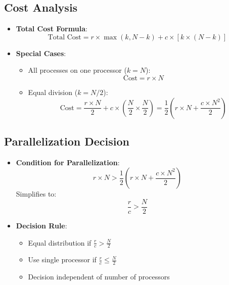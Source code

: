 \documentclass[12pt]{article}
\begin{document}
\subsection{Cost Analysis}
\begin{itemize}
  \item \textbf{Total Cost Formula}:
        \[
          \text{Total Cost} = r \times \max(k, N-k) + c \times [k \times (N-k)]
        \]

  \item \textbf{Special Cases}:
        \begin{itemize}
          \item All processes on one processor ($k = N$):
                \[
                  \text{Cost} = r \times N
                \]

          \item Equal division ($k = N/2$):
                \[
                  \text{Cost} = \frac{r \times N}{2} + c \times \left(\frac{N}{2} \times \frac{N}{2}\right) = \frac{1}{2}\left(r \times N + \frac{c \times N^2}{2}\right)
                \]
        \end{itemize}
\end{itemize}

\subsection{Parallelization Decision}
\begin{itemize}
  \item \textbf{Condition for Parallelization}:
        \[
          r \times N > \frac{1}{2}\left(r \times N + \frac{c \times N^2}{2}\right)
        \]
        Simplifies to:
        \[
          \frac{r}{c} > \frac{N}{2}
        \]

  \item \textbf{Decision Rule}:
        \begin{itemize}
          \item Equal distribution if $\frac{r}{c} > \frac{N}{2}$
          \item Use single processor if $\frac{r}{c} \leq \frac{N}{2}$
          \item Decision independent of number of processors
        \end{itemize}
\end{itemize}
\end{document}
